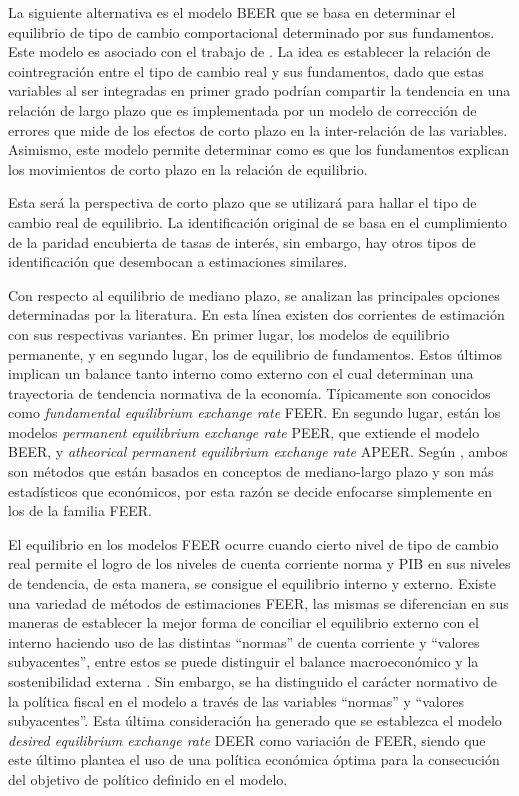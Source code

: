 \documentclass[12pt,letterpaper]{article}
\begin{document}
La siguiente alternativa es el modelo BEER que se basa en determinar el equilibrio de tipo de cambio comportacional determinado por sus fundamentos. Este modelo es asociado con el trabajo de \cite{clark1999exchange}. La idea es establecer la relación de cointregración entre el tipo de cambio real y sus fundamentos, dado que estas variables al ser integradas en primer grado podrían compartir la tendencia en una relación de largo plazo que es implementada por un modelo de corrección de errores que mide de los efectos de corto plazo en la inter-relación de las variables. Asimismo, este modelo permite determinar como es que los fundamentos explican los movimientos de corto plazo en la relación de equilibrio.

Esta será la perspectiva de corto plazo que se utilizará para hallar el tipo de cambio real de equilibrio. La identificación original de \cite{clark1999exchange} se basa en el cumplimiento de la paridad encubierta de tasas de interés, sin embargo, hay otros tipos de identificación que desembocan a estimaciones similares.

Con respecto al equilibrio de mediano plazo, se analizan las principales opciones determinadas por la literatura. En esta línea existen dos corrientes de estimación con sus respectivas variantes. En primer lugar, los modelos de equilibrio permanente, y en segundo lugar, los de equilibrio de fundamentos. Estos últimos implican un balance tanto interno como externo con el cual determinan una trayectoria de tendencia normativa de la economía. Típicamente son conocidos como \emph{fundamental equilibrium exchange rate} FEER. En segundo lugar, están los modelos \emph{permanent equilibrium exchange rate} PEER, que extiende el modelo BEER, y \emph{atheorical permanent equilibrium exchange rate} APEER. Según \cite{driver2005concepts}, ambos son métodos que están basados en conceptos de mediano-largo plazo y son más estadísticos que económicos, por esta razón se decide enfocarse simplemente en los de la familia FEER.

El equilibrio en los modelos FEER ocurre cuando cierto nivel de tipo de cambio real permite el logro de los niveles de cuenta corriente norma y PIB en sus niveles de tendencia, de esta manera, se consigue el equilibrio interno y externo. Existe una variedad de métodos de estimaciones FEER, las mismas se diferencian en sus maneras de establecer la mejor forma de conciliar el equilibrio externo con el interno haciendo uso de las distintas ``normas'' de cuenta corriente y ``valores subyacentes'', entre estos se puede distinguir el balance macroeconómico y la sostenibilidad externa \citep{bussiere2010methodological}. Sin embargo, se ha distinguido el carácter normativo de la política fiscal en el modelo a través de las variables ``normas'' y ``valores subyacentes''. Esta última consideración ha generado que se establezca el modelo \emph{desired equilibrium exchange rate} DEER como variación de FEER, siendo que este último plantea el uso de una política económica óptima para la consecución del objetivo de político definido en el modelo.
\end{document}
